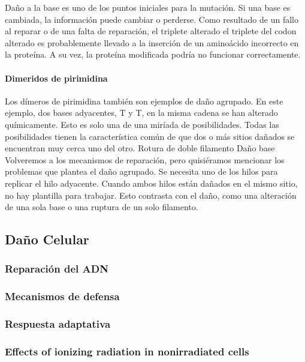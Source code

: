 Daño a la base es uno de los puntos iniciales para la mutación. Si una base es cambiada, la información puede cambiar o perderse. Como resultado de un fallo al reparar o de una falta de reparación, el triplete alterado el triplete del codon alterado es probablemente llevado a la inserción de un aminoácido incorrecto en la proteína. A su vez, la proteína modificada podría no funcionar correctamente.


\paragraph{Dimeridos de pirimidina}

Los dímeros de pirimidina también son ejemplos de daño agrupado. En este ejemplo, dos bases adyacentes, T y T, en la misma cadena se han alterado químicamente. Esto es solo una de una miríada de posibilidades. Todas las posibilidades tienen la característica común de que dos o más sitios dañados se encuentran muy cerca uno del otro. Rotura de doble filamento Daño base Volveremos a los mecanismos de reparación, pero quisiéramos mencionar los problemas que plantea el daño agrupado. Se necesita uno de los hilos para replicar el hilo adyacente. Cuando ambos hilos están dañados en el mismo sitio, no hay plantilla para trabajar. Esto contrasta con el daño, como una alteración de una sola base o una ruptura de un solo filamento.


\subsection{Daño Celular}
\subsubsection{Reparación del ADN}
\subsubsection{Mecanismos de defensa}
\subsubsection{Respuesta adaptativa}
\subsubsection{Effects of ionizing radiation in nonirradiated cells}
\cite{willmari}
